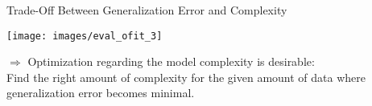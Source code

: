 \documentclass[11pt,compress,t,notes=noshow, xcolor=table]{beamer}
\newenvironment{knitrout}{}{} %
\begin{document}



\begin{vbframe}{Trade-Off Between Generalization Error and Complexity}


\lz
\begin{knitrout}\scriptsize
{}\color{fgcolor}

{\centering \texttt{[image: images/eval\_ofit\_3]} 

}



\end{knitrout}

\lz
$\Rightarrow$ Optimization regarding the model complexity is desirable:\\ 
Find the right amount of complexity for the given amount of data where generalization error becomes minimal.

\end{vbframe}

\endlecture
\end{document}
